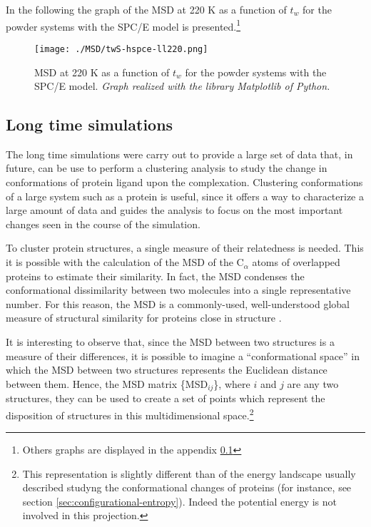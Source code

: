 In the following the graph of the MSD at 220 K as a function of $t_w$ for the powder systems with the SPC/E model is presented.\footnote{Others graphs are displayed in the appendix \ref{}}
\begin{figure}[H]
\centering
\begin{minipage}[t]{\textwidth}
	\centering
    \texttt{[image: ./MSD/twS-hspce-ll220.png]}
    
    \footnotesize{\caption{MSD at 220 K as a function of $t_w$ for the powder systems with the SPC/E model. \textit{Graph realized with the library Matplotlib of Python.}}
    \label{fig:wrong-hydr}
    }
\end{minipage} 
\end{figure}

\subsection{Long time simulations}
The long time simulations were carry out to provide a large set of data that, in future, can be use to perform a clustering analysis to study the change in conformations of protein ligand upon the complexation. Clustering conformations of a large system such as a protein is useful, since it offers a way to characterize a large amount of data and guides the analysis to focus on the most important changes seen in the course of the simulation. 

To cluster protein structures, a single measure of their relatedness is needed. This it is possible with the calculation of the MSD of the C$_\alpha$ atoms of overlapped proteins to estimate their similarity. In fact, the MSD condenses the conformational dissimilarity between two molecules into a single representative number. For this reason, the MSD is a commonly-used, well-understood global measure of structural similarity for proteins close in structure \cite{troyer1995protein}. 

It is interesting to observe that, since the MSD between two structures is a measure of their differences, it is possible to imagine a “conformational space” in which the MSD between two structures represents the Euclidean distance between them. Hence, the MSD matrix \{MSD$_{ij}$\}, where $i$ and $j$ are any two structures, they can be used to create a set of points which represent the disposition of structures in this multidimensional space.\footnote{This representation is slightly different than of the energy landscape usually described studyng the conformational changes of proteins (for instance, see section \ref{sec:configurational-entropy}). Indeed the potential energy is not involved in this projection.}
 
